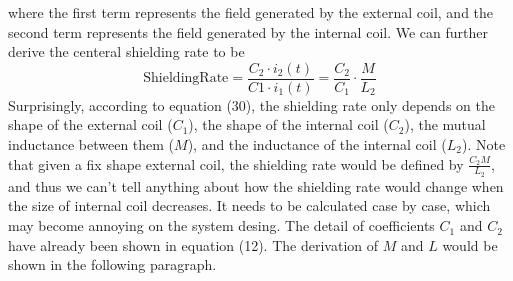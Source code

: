 where the first term represents the field generated by the external coil,
and the second term represents the field generated by the internal coil.
We can further derive the centeral shielding rate to be
\begin{equation}
  \mathrm{Shielding Rate} = \frac{C_2\cdot i_2(t)}{C1\cdot i_1(t)} = \frac{C_2}{C_1}\cdot\frac{M}{L_2}
\end{equation}
Surprisingly, according to equation (30),
the shielding rate only depends on the shape of the external coil ($C_1$),
the shape of the internal coil ($C_2$),
the mutual inductance between them ($M$),
and the inductance of the internal coil ($L_2$).
Note that given a fix shape external coil,
the shielding rate would be defined by $\frac{C_2M}{L_2}$,
and thus we can't tell anything about how the shielding rate would change when the size of internal coil decreases.
It needs to be calculated case by case, which may become annoying on the system desing.
The detail of coefficients $C_1$ and $C_2$ have already been shown in equation (12).
The derivation of $M$ and $L$ would be shown in the following paragraph.


